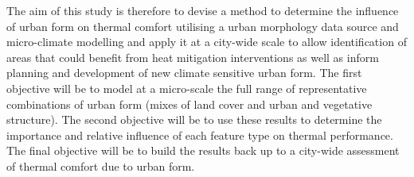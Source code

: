 \documentclass[final,3p,times,authoryear]{elsarticle}
\begin{document}
The aim of this study is therefore to devise a method to determine the influence of urban form on thermal comfort utilising a urban morphology data source and micro-climate modelling and apply it at a city-wide scale to allow identification of areas that could benefit from heat mitigation interventions as well as inform planning and development of new climate sensitive urban form. The first objective will be to model at a micro-scale the full range of representative combinations of urban form (mixes of land cover and urban and vegetative structure). The second objective will be to use these results to determine the importance and relative influence of each feature type on thermal performance. The final objective will be to build the results back up to a city-wide assessment of thermal comfort due to urban form.


%
%
%
%  
%
%
%
%
%
%
%
%
%


\end{document}
